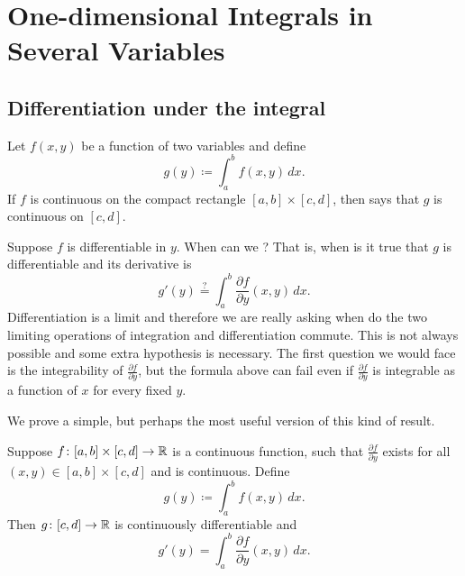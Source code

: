 \chapter{One-dimensional Integrals in Several Variables} \label{path:chapter}


\section{Differentiation under the integral}
\label{sec:diffunderint}


Let $f(x,y)$ be a function of two variables and define
\begin{equation*}
g(y) \coloneqq \int_a^b f(x,y) \,dx .
\end{equation*}
If $f$ is continuous on the compact rectangle $[a,b] \times [c,d]$, then
says that $g$ is continuous on $[c,d]$.

Suppose $f$ is differentiable in $y$.  
When can we ?
That is, when is it true that $g$ is differentiable and its derivative is
\begin{equation*}
g'(y) \overset{?}{=} \int_a^b \frac{\partial f}{\partial y}(x,y) \,dx .
\end{equation*}
Differentiation is a limit and therefore we are really asking when do the
two limiting operations of integration and differentiation commute.
This is not always possible and some extra hypothesis is
necessary.  The first
question we would face is the integrability of
$\frac{\partial f}{\partial y}$, but the formula above can fail even if
$\frac{\partial f}{\partial y}$ is integrable as a function of $x$ for every
fixed $y$.

We prove a simple, but perhaps the most useful version of this kind of result.

\begin{thm}
Suppose $f \colon [a,b] \times [c,d] \to {\mathbb{R}}$ is a continuous function,
such that $\frac{\partial f}{\partial y}$ exists for all $(x,y) \in [a,b]
\times [c,d]$ and is continuous.  Define
\begin{equation*}
g(y) \coloneqq \int_a^b f(x,y) \,dx .
\end{equation*}
Then $g \colon [c,d] \to {\mathbb{R}}$ is continuously differentiable and
\begin{equation*}
g'(y) = \int_a^b \frac{\partial f}{\partial y}(x,y) \,dx .
\end{equation*}
\end{thm}


